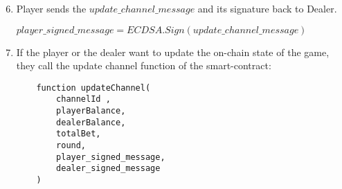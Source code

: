 \begin{algorithm}
\begin{enumerate}
\setcounter{enumi}{5}
\item Player sends the $update\_channel\_message$ and its signature back to Dealer. 
\begin{center}
 $player\_signed\_message = ECDSA.Sign(update\_channel\_message)$
\end{center}
 \item If the player or the dealer want to update the on-chain state of the game, they call the update channel function of the smart-contract:
\begin{lstlisting}
    function updateChannel(
        channelId ,
        playerBalance,
        dealerBalance,
        totalBet,
        round,
        player_signed_message,
        dealer_signed_message
    )
\end{lstlisting}
\end{enumerate}
\end{algorithm}

